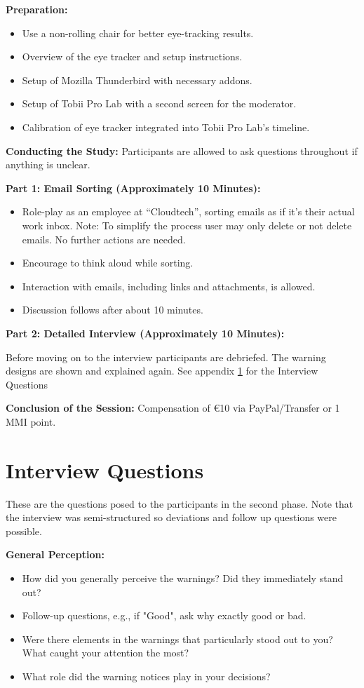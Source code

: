 \documentclass[
  a4paper,  %
  twoside,  %
  bibliography=totoc,
  headsepline,
  cleardoublepage=empty,
  parskip=half,
  draft=false
]{scrbook}
\begin{document}
\textbf{Preparation:}
\begin{itemize}
    \item Use a non-rolling chair for better eye-tracking results.
    \item Overview of the eye tracker and setup instructions.
    \item Setup of Mozilla Thunderbird with necessary addons.
    \item Setup of Tobii Pro Lab with a second screen for the moderator.
    \item Calibration of eye tracker integrated into Tobii Pro Lab's timeline.
\end{itemize}

\textbf{Conducting the Study:} Participants are allowed to ask questions throughout if anything is unclear.

\textbf{Part 1: Email Sorting (Approximately 10 Minutes):}
\begin{itemize}
    \item Role-play as an employee at ``Cloudtech'', sorting emails as if it's their actual work inbox. Note: To simplify the process user may only delete or not delete emails. No further actions are needed.
    \item Encourage to think aloud while sorting.
    \item Interaction with emails, including links and attachments, is allowed.
    \item Discussion follows after about 10 minutes.
\end{itemize}

\textbf{Part 2: Detailed Interview (Approximately 10 Minutes):}

Before moving on to the interview participants are debriefed. The warning designs are shown and explained again. See appendix \ref{sec:interview} for the Interview Questions

\textbf{Conclusion of the Session:} Compensation of €10 via PayPal/Transfer or 1 MMI point.


\section{Interview Questions}
\label{sec:interview}
These are the questions posed to the participants in the second phase. Note that the interview was semi-structured so deviations and follow up questions were possible.

\textbf{General Perception:}

\begin{itemize}
    \item How did you generally perceive the warnings? Did they immediately stand out?
    \item Follow-up questions, e.g., if "Good", ask why exactly good or bad.
    \item Were there elements in the warnings that particularly stood out to you? What caught your attention the most?
    \item What role did the warning notices play in your decisions?
\end{itemize}
\end{document}
